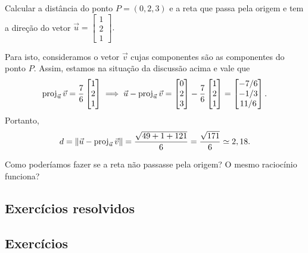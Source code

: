 \begin{ex}
	Calcular a distância do ponto $P = (0,2,3)$ e a reta que passa pela origem e tem a direção do vetor $\vec{u} =
	\begin{bmatrix}
	1 \\ 2 \\1
	\end{bmatrix}.$

	Para isto, consideramos o vetor $\vec{v}$ cujas componentes são as componentes do ponto $P$. Assim, estamos na situação da discussão acima e vale que
	\begin{equation}
	\operatorname{proj}_{\vec{u}} \vec{v} = \frac{7}{6}
	\begin{bmatrix}
	1 \\ 2 \\1
	\end{bmatrix} \implies
	\vec{u} - \operatorname{proj}_{\vec{u}} \vec{v} =
	\begin{bmatrix}
	0 \\ 2 \\ 3
	\end{bmatrix} - \frac{7}{6}
	\begin{bmatrix}
	1 \\ 2 \\1
	\end{bmatrix} =
	\begin{bmatrix}
	-7/6 \\ -1/3 \\ 11/6
	\end{bmatrix}.
	\end{equation} Portanto,
	\begin{equation}
	d = \|\vec{u} - \operatorname{proj}_{\vec{u}} \vec{v}\| = \frac{\sqrt{49 + 1 + 121}}{6} = \frac{\sqrt{171}}{6} \simeq 2,18.
	\end{equation}
\end{ex}

\begin{exer}
	Como poderíamos fazer se a reta não passasse pela origem? O mesmo raciocínio funciona?
\end{exer}

\subsection*{Exercícios resolvidos}

\construirExeresol

\subsection*{Exercícios}

